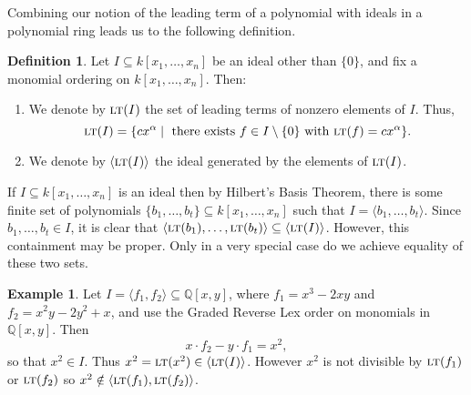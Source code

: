 \documentclass[MS, xcolor=dvipsnames]{wfuthesis}
\def\bQ{\mathbb{Q}}
\def\sbs{\subseteq}
\newcommand{\LT}{\ensuremath{\text{\sc lt}}}
\theoremstyle{definition}
\newtheorem{definition}[theorem]{Definition}
\newtheorem{example}[theorem]{Example}
\begin{document}
Combining our notion of the leading term of a polynomial with ideals in a polynomial ring leads us to the following definition.
\begin{definition}
  Let $I \sbs k[x_1,\dots,x_n]$ be an ideal other than $\{0\}$, and fix a monomial ordering on $k[x_1,\dots,x_n]$. Then: 
  \begin{enumerate}[label=(\roman*)]
    \item We denote by $\LT(I)$ the set of leading terms of nonzero elements of $I$. Thus,
    \[ \LT(I) = \{ cx^\alpha \mid \text{ there exists } f \in I \setminus \{0\} \text{ with } \LT(f) = cx^\alpha \}. \]
    \item We denote by $\langle \LT(I) \rangle$ the ideal generated by the elements of $\LT(I)$. 
  \end{enumerate}
\end{definition}
If $I \sbs k[x_1,\dots,x_n]$ is an ideal then by Hilbert's Basis Theorem, there is some finite set of polynomials $\{ b_1,\dots,b_t \} \sbs k[x_1,\dots,x_n]$ such that $I = \langle b_1,\dots,b_t \rangle$. Since $b_1,\dots,b_t \in I$, it is clear that $\langle \LT(b_1), \dots, \LT(b_t) \rangle \sbs \langle \LT(I) \rangle$. However, this containment may be proper. Only in a very special case do we achieve equality of these two sets. 
\begin{example}
  Let $I = \langle f_1,f_2 \rangle \sbs \bQ[x,y]$, where $f_1=x^3-2xy$ and $f_2=x^2y-2y^2+x$, and use the Graded Reverse Lex order on monomials in $\bQ[x,y]$. Then 
  \[ x \cdot f_2 - y \cdot f_1 = x^2, \]
  so that $x^2 \in I$. Thus $x^2 = \LT(x^2) \in \langle \LT(I) \rangle$. However $x^2$ is not divisible by $\LT(f_1)$ or $\LT(f_2)$ so $x^2 \notin \langle \LT(f_1), \LT(f_2) \rangle$. 
\end{example}
\end{document}
